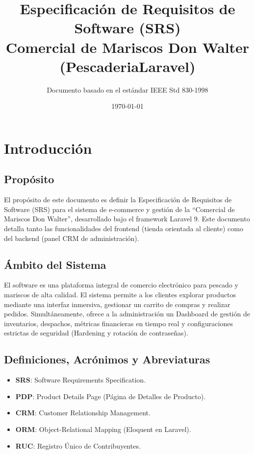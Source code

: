 \documentclass[12pt, a4paper]{article}
\title{\textbf{Especificación de Requisitos de Software (SRS)}\\ \Large Comercial de Mariscos Don Walter (PescaderiaLaravel)}
\author{Documento basado en el estándar IEEE Std 830-1998}
\date{\today}
\begin{document}
\maketitle
\tableofcontents
\newpage

\section{Introducción}

\subsection{Propósito}
El propósito de este documento es definir la Especificación de Requisitos de Software (SRS) para el sistema de e-commerce y gestión de la ``Comercial de Mariscos Don Walter'', desarrollado bajo el framework Laravel 9. Este documento detalla tanto las funcionalidades del frontend (tienda orientada al cliente) como del backend (panel CRM de administración).

\subsection{Ámbito del Sistema}
El software es una plataforma integral de comercio electrónico para pescado y mariscos de alta calidad. El sistema permite a los clientes explorar productos mediante una interfaz inmersiva, gestionar un carrito de compras y realizar pedidos. Simultáneamente, ofrece a la administración un Dashboard de gestión de inventarios, despachos, métricas financieras en tiempo real y configuraciones estrictas de seguridad (Hardening y rotación de contraseñas).

\subsection{Definiciones, Acrónimos y Abreviaturas}
\begin{itemize}
    \item \textbf{SRS}: Software Requirements Specification.
    \item \textbf{PDP}: Product Details Page (Página de Detalles de Producto).
    \item \textbf{CRM}: Customer Relationship Management.
    \item \textbf{ORM}: Object-Relational Mapping (Eloquent en Laravel).
    \item \textbf{RUC}: Registro Único de Contribuyentes.
\end{itemize}
\end{document}
